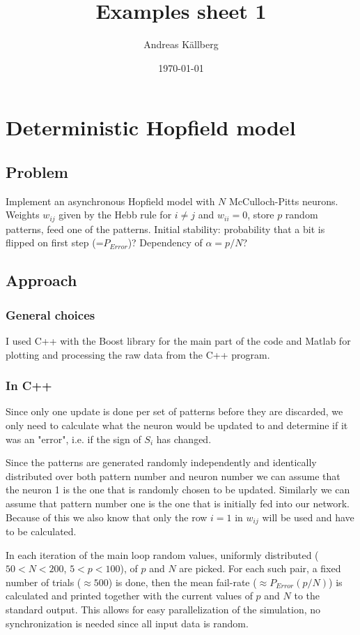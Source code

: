 \documentclass[12pt,a4paper]{article}
\begin{document}
\title{Examples sheet 1}
\author{Andreas Källberg}
\date{\today}
\maketitle
\tableofcontents
\newpage


\section{\label{dhm}Deterministic Hopfield model}
\subsection{Problem}
Implement an asynchronous Hopfield model with $N$ McCulloch-Pitts neurons. Weights $w_{i j}$
given by the Hebb rule for $i \neq j$ and $w_{ii}=0$, store $p$ random
patterns, feed one of the patterns. Initial stability: probability that a bit
is flipped on first step (=$P_{Error}$)? Dependency of $\alpha = p/N$?


\subsection{Approach} \label{app1}
\subsubsection{General choices}
I used C++ with the Boost library for the main part of the code and Matlab for plotting and processing the raw data from the C++ program.

\subsubsection{In C++}
Since only one update is done per set of patterns before they are discarded, we
only need to calculate what the neuron would be updated to and determine if it was an "error", i.e. if the sign of $S_i$ has changed.

Since the patterns are generated randomly independently and identically
distributed over both pattern number and neuron number we can assume that the
neuron 1 is the one that is randomly chosen to be updated. Similarly we can
assume that pattern number one is the one that is initially fed into our
network.  Because of this we also know that only the row $i=1$ in $w_{ij}$
will be used and have to be calculated.

In each iteration of the main loop random values, uniformly distributed
($50<N<200$, $5<p<100$), of $p$ and $N$ are picked.  For each such pair, a
fixed number of trials ($\approx 500$) is done, then the mean fail-rate
($\approx P_{Error}(p/N)$) is calculated and printed together with the
current values of $p$ and $N$ to the standard output. This allows for easy
parallelization of the simulation, no synchronization is needed since all
input data is random.
\end{document}
